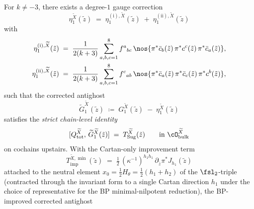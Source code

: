 \begin{theorem}
\label{thm:bp-sugawara-antighost-strict-chain-level-on-branched-cover}
\ClaimStatusProvedHere
For $k \ne -3$, there exists a degree-$1$ gauge correction
\begin{equation}\label{eq:bp-eta1-upstairs}
 \eta_1^{\widetilde X}(\tilde z)
 \;=\; \eta_1^{(\mathrm i), \widetilde X}(\tilde z) \;+\;
 \eta_1^{(\mathrm{ii}), \widetilde X}(\tilde z)
\end{equation}
with
\begin{align}
 \eta_1^{(\mathrm i), \widetilde X}(\tilde z)
 &\;=\; \frac{1}{2(k+3)}
 \sum_{a,b,c=1}^{8} f^{a}{}_{bc}\,
 \nos{\pi^{\ast}\bar c_{b}(\tilde z)\,\pi^{\ast}c^{c}(\tilde z)\,\pi^{\ast}\bar c_{a}(\tilde z)},
 \label{eq:bp-eta1-i-upstairs}\\
 \eta_1^{(\mathrm{ii}), \widetilde X}(\tilde z)
 &\;=\; \frac{1}{2(k+3)}
 \sum_{a,b,c=1}^{8} f^{c}{}_{ab}\,
 \nos{\pi^{\ast}\bar c_{a}(\tilde z)\,\pi^{\ast}\bar c_{c}(\tilde z)\,\pi^{\ast}c^{b}(\tilde z)},
 \label{eq:bp-eta1-ii-upstairs}
\end{align}
such that the corrected antighost
\begin{equation}\label{eq:bp-tilde-G1-upstairs}
 \widetilde G_1^{\widetilde X}(\tilde z)
 \;\coloneqq\; G_1^{\widetilde X}(\tilde z) \;-\; \eta_1^{\widetilde X}(\tilde z)
\end{equation}
satisfies the \emph{strict chain-level identity}
\begin{equation}\label{eq:bp-strict-chain-upstairs}
 [Q_{\mathrm{tot}}^{\widetilde X},\,
 \widetilde G_1^{\widetilde X}(\tilde z)]
 \;=\; T_{\mathrm{Sug}}^{\widetilde X}(\tilde z)
 \qquad \text{in $\cO_{\mathrm{bulk}}^{\widetilde X}$}
\end{equation}
on cochains upstairs. With the Cartan-only improvement
term
\begin{equation}\label{eq:bp-improvement-upstairs}
 T_{\mathrm{imp}}^{\widetilde X, \min}(\tilde z)
 \;=\; \tfrac{1}{2}\,(\kappa^{-1})^{h_1 h_1}\,
 \partial_{\tilde z} \pi^{\ast}J_{h_1}(\tilde z)
\end{equation}
attached to the neutral element
$x_0 = \tfrac{1}{2} H_{\theta} = \tfrac{1}{2}(h_1 + h_2)$ of the
$\fsl_2$-triple (contracted through the invariant form to a single
Cartan direction $h_1$ under the choice of representative for the
BP minimal-nilpotent reduction), the BP-improved corrected
antighost

\end{theorem}
